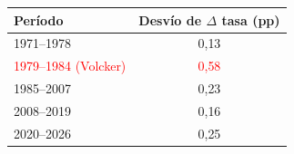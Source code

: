 \begin{tabular}{lc}
\toprule
Per\'iodo & Desv\'io de $\Delta$ tasa (pp)
\\ \midrule
1971--1978 & 0{,}13 \\
\textcolor{red}{1979--1984 (Volcker)} & \textcolor{red}{0{,}58} \\
1985--2007 & 0{,}23 \\
2008--2019 & 0{,}16 \\
2020--2026 & 0{,}25 \\
\bottomrule
\end{tabular}
